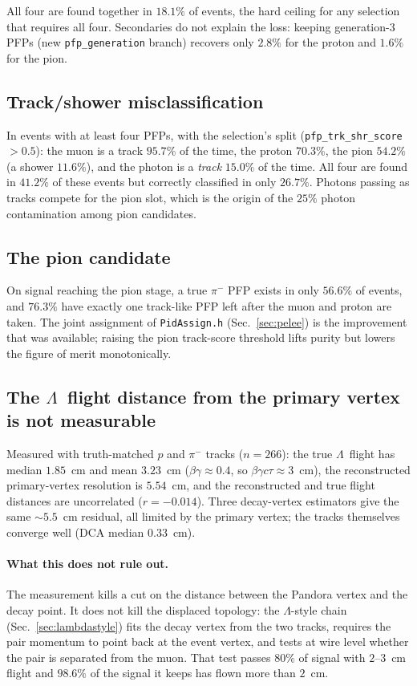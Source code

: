 \documentclass[11pt,a4paper]{article}
\newcommand{\Lam}{\ensuremath{\Lambda}}
\begin{document}
All four are found together in $18.1\%$ of events, the hard ceiling for any selection
that requires all four. Secondaries do not explain the loss: keeping generation-3
PFPs (new \texttt{pfp\_generation} branch) recovers only $2.8\%$ for the proton and
$1.6\%$ for the pion.

\subsection{Track/shower misclassification}

In events with at least four PFPs, with the selection's split
(\texttt{pfp\_trk\_shr\_score}~$>0.5$): the muon is a track $95.7\%$ of the time,
the proton $70.3\%$, the pion $54.2\%$ (a shower $11.6\%$), and the photon is a
\emph{track} $15.0\%$ of the time. All four are found in $41.2\%$ of these events but
correctly classified in only $26.7\%$. Photons passing as tracks compete for the pion
slot, which is the origin of the $25\%$ photon contamination among pion candidates.

\subsection{The pion candidate}

On signal reaching the pion stage, a true $\pi^-$ PFP exists in only $56.6\%$ of
events, and $76.3\%$ have exactly one track-like PFP left after the muon and proton
are taken. The joint assignment of \texttt{PidAssign.h} (Sec.~\ref{sec:pelee}) is the
improvement that was available; raising the pion track-score threshold lifts purity
but lowers the figure of merit monotonically.

\subsection{The \Lam\ flight distance from the primary vertex is not measurable}

Measured with truth-matched $p$ and $\pi^-$ tracks ($n=266$): the true \Lam\ flight
has median $1.85$~cm and mean $3.23$~cm ($\beta\gamma \approx 0.4$, so
$\beta\gamma c\tau \approx 3$~cm), the reconstructed primary-vertex resolution is
$5.54$~cm, and the reconstructed and true flight distances are uncorrelated
($r=-0.014$). Three decay-vertex estimators give the same $\sim5.5$~cm residual, all
limited by the primary vertex; the tracks themselves converge well (DCA median
$0.33$~cm).

\paragraph{What this does not rule out.} The measurement kills a cut on the distance
between the Pandora vertex and the decay point. It does not kill the displaced
topology: the \Lam-style chain (Sec.~\ref{sec:lambdastyle}) fits the decay vertex
from the two tracks, requires the pair momentum to point back at the event vertex,
and tests at wire level whether the pair is separated from the muon. That test passes
$80\%$ of signal with $2$--$3$~cm flight and $98.6\%$ of the signal it keeps has
flown more than $2$~cm.
\end{document}
